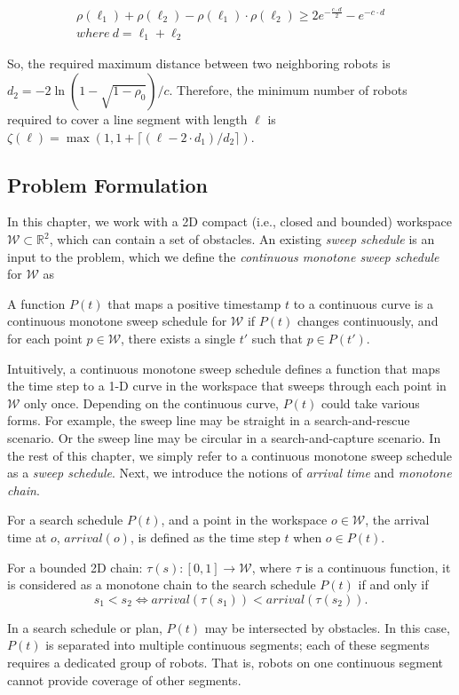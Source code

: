 \begin{align*}
\rho(\ell_1) + \rho(\ell_2) - \rho(\ell_1)\cdot \rho(\ell_2)\geq 2e^{-\frac{c\cdot d}{2}} - e^{-c\cdot d}    \\
where\ d = \ell_1+\ell_2
\end{align*}

So, the required maximum distance between two neighboring robots is $d_2=-2\ln(1-\sqrt{1-\rho_0})/c$.
Therefore, the minimum number of robots required to cover a line segment with length $\ell$ is 
$\zeta(\ell) = \max(1, 1 + \lceil(\ell-2\cdot d_1)/d_2 \rceil )$.


\subsection{Problem Formulation}
In this chapter, we work with a 2D compact (i.e., closed and bounded) workspace 
${\mathcal W} \subset \mathbb{R}^2$, which can contain a set of obstacles. 
An existing \emph{sweep schedule} is an input to the problem, which we
define the \emph{continuous monotone sweep schedule} for $\mathcal W$ as 
\begin{definition}
A function $P(t)$ that maps a positive timestamp $t$ to a continuous curve is a continuous monotone sweep schedule for $\mathcal W$ if $P(t)$ changes continuously, 
and for each point $p\in \mathcal W$, there exists a single $t'$ such that $p\in P(t')$.
\end{definition}

Intuitively, a continuous monotone sweep schedule defines a function 
that maps the time step to a 1-D curve in the workspace that sweeps 
through each point in $\mathcal W$ only once. 
%
Depending on the continuous curve, $P(t)$ could take various forms. For example, the sweep line may be straight in a search-and-rescue scenario. Or the sweep line may be circular in a search-and-capture scenario. 
In the rest of this chapter, we simply refer to a continuous monotone sweep schedule as a \emph{sweep schedule}. Next, we introduce the notions of \emph{arrival time} and \emph{monotone chain}.
%
\begin{definition}
For a search schedule $P(t)$, and a point in the workspace $o\in\mathcal W$,
the arrival time at $o$, $arrival(o)$, is defined as the time step $t$ when $o\in P(t)$.
\end{definition}

\begin{definition}
For a bounded 2D chain: $\tau(s): [0,1]\rightarrow\mathcal{W}$, where $\tau$ is a continuous function, it is considered as a monotone chain to the search schedule $P(t)$ if and only if
\[s_1 < s_2 \Leftrightarrow arrival(\tau(s_1)) < arrival(\tau(s_2)).\]
\end{definition}
In a search schedule or plan, $P(t)$ may be intersected by obstacles. In this case, $P(t)$ is separated into multiple continuous segments; each of these segments requires a dedicated group of robots. That is, robots on one continuous segment cannot provide coverage of other segments. 

